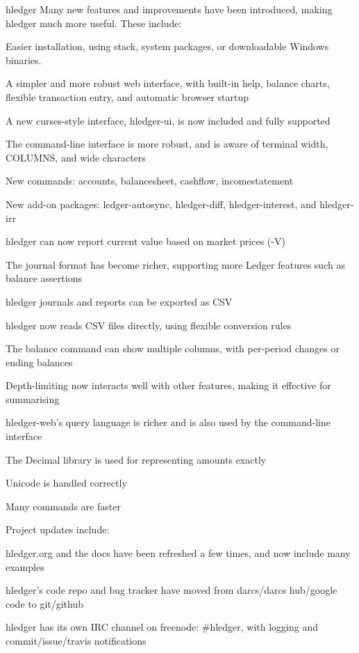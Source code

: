 \begin{hcarentry}[updated]{hledger}
Many new features and improvements have been introduced, making hledger much more useful.
These include:
\begin{compactitem}
\item Easier installation, using stack, system packages, or downloadable Windows binaries.
\item A simpler and more robust web interface, with built-in help, balance charts, flexible transaction entry, and automatic browser startup
\item A new curses-style interface, hledger-ui, is now included and fully supported
\item The command-line interface is more robust, and is aware of terminal width, COLUMNS, and wide characters
\item New commands: accounts, balancesheet, cashflow, incomestatement
\item New add-on packages: ledger-autosync, hledger-diff, hledger-interest, and hledger-irr
\item hledger can now report current value based on market prices (-V)
\item The journal format has become richer, supporting more Ledger features such as balance assertions
\item hledger journals and reports can be exported as CSV
\item hledger now reads CSV files directly, using flexible conversion rules
\item The balance command can show multiple columns, with per-period changes or ending balances
\item Depth-limiting now interacts well with other features, making it effective for summarising
\item hledger-web's query language is richer and is also used by the command-line interface
\item The Decimal library is used for representing amounts exactly
\item Unicode is handled correctly
\item Many commands are faster
\end{compactitem}

Project updates include:
\begin{compactitem}
\item hledger.org and the docs have been refreshed a few times, and now include many examples
\item hledger's code repo and bug tracker have moved from darcs/darcs hub/google code to git/github
\item hledger has its own IRC channel on freenode: #hledger, with logging and commit/issue/travis notifications
\end{compactitem}


\end{hcarentry}
